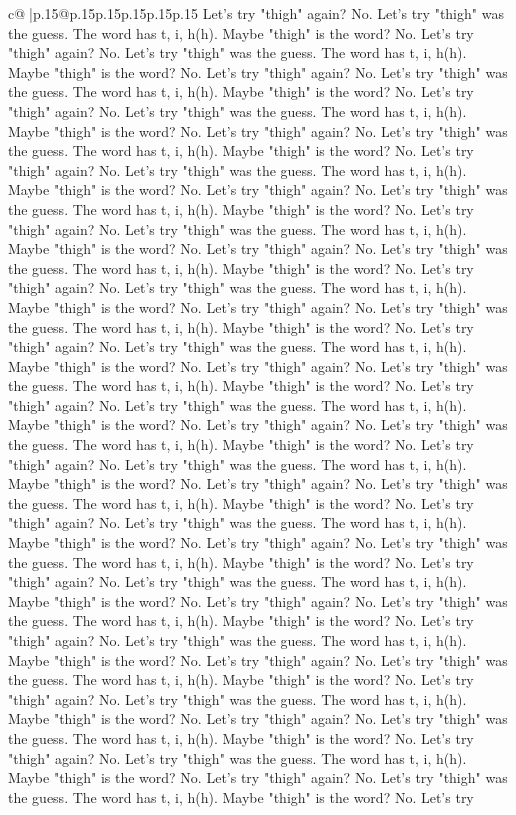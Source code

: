 \documentclass{article}
\begin{document}
{\begin{supertabular}{c@{$\;$}|p{.15\linewidth}@{}p{.15\linewidth}p{.15\linewidth}p{.15\linewidth}p{.15\linewidth}p{.15\linewidth}}
{{{Let's try "thigh" again? No. Let's try "thigh" was the guess. The word has t, i, h(h). Maybe "thigh" is the word? No. Let's try "thigh" again? No. Let's try "thigh" was the guess. The word has t, i, h(h). Maybe "thigh" is the word? No. Let's try "thigh" again? No. Let's try "thigh" was the guess. The word has t, i, h(h). Maybe "thigh" is the word? No. Let's try "thigh" again? No. Let's try "thigh" was the guess. The word has t, i, h(h). Maybe "thigh" is the word? No. Let's try "thigh" again? No. Let's try "thigh" was the guess. The word has t, i, h(h). Maybe "thigh" is the word? No. Let's try "thigh" again? No. Let's try "thigh" was the guess. The word has t, i, h(h). Maybe "thigh" is the word? No. Let's try "thigh" again? No. Let's try "thigh" was the guess. The word has t, i, h(h). Maybe "thigh" is the word? No. Let's try "thigh" again? No. Let's try "thigh" was the guess. The word has t, i, h(h). Maybe "thigh" is the word? No. Let's try "thigh" again? No. Let's try "thigh" was the guess. The word has t, i, h(h). Maybe "thigh" is the word? No. Let's try "thigh" again? No. Let's try "thigh" was the guess. The word has t, i, h(h). Maybe "thigh" is the word? No. Let's try "thigh" again? No. Let's try "thigh" was the guess. The word has t, i, h(h). Maybe "thigh" is the word? No. Let's try "thigh" again? No. Let's try "thigh" was the guess. The word has t, i, h(h). Maybe "thigh" is the word? No. Let's try "thigh" again? No. Let's try "thigh" was the guess. The word has t, i, h(h). Maybe "thigh" is the word? No. Let's try "thigh" again? No. Let's try "thigh" was the guess. The word has t, i, h(h). Maybe "thigh" is the word? No. Let's try "thigh" again? No. Let's try "thigh" was the guess. The word has t, i, h(h). Maybe "thigh" is the word? No. Let's try "thigh" again? No. Let's try "thigh" was the guess. The word has t, i, h(h). Maybe "thigh" is the word? No. Let's try "thigh" again? No. Let's try "thigh" was the guess. The word has t, i, h(h). Maybe "thigh" is the word? No. Let's try "thigh" again? No. Let's try "thigh" was the guess. The word has t, i, h(h). Maybe "thigh" is the word? No. Let's try "thigh" again? No. Let's try "thigh" was the guess. The word has t, i, h(h). Maybe "thigh" is the word? No. Let's try "thigh" again? No. Let's try "thigh" was the guess. The word has t, i, h(h). Maybe "thigh" is the word? No. Let's try "thigh" again? No. Let's try "thigh" was the guess. The word has t, i, h(h). Maybe "thigh" is the word? No. Let's try "thigh" again? No. Let's try "thigh" was the guess. The word has t, i, h(h). Maybe "thigh" is the word? No. Let's try "thigh" again? No. Let's try "thigh" was the guess. The word has t, i, h(h). Maybe "thigh" is the word? No. Let's try "thigh" again? No. Let's try "thigh" was the guess. The word has t, i, h(h). Maybe "thigh" is the word? No. Let's try "thigh" again? No. Let's try "thigh" was the guess. The word has t, i, h(h). Maybe "thigh" is the word? No. Let's try "thigh" again? No. Let's try "thigh" was the guess. The word has t, i, h(h). Maybe "thigh" is the word? No. Let's try "thigh" again? No. Let's try "thigh" was the guess. The word has t, i, h(h). Maybe "thigh" is the word? No. Let's try }}}
\end{supertabular}}
\end{document}
